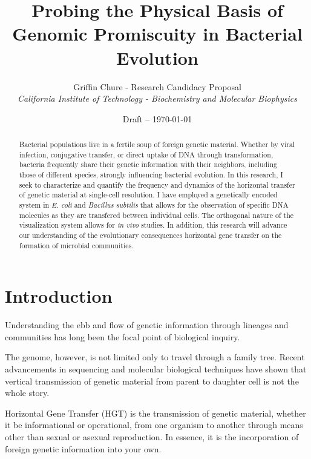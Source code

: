 
\usepackage{textcomp}

\title{Probing the Physical Basis of Genomic Promiscuity in Bacterial Evolution}
\author{Griffin Chure - Research Candidacy Proposal\\
	\textit{\small California Institute of Technology - Biochemistry and Molecular
	Biophysics}}
\date{\small Draft -- \today}


\maketitle
\begin{abstract}
	Bacterial populations live in a fertile soup of foreign genetic
	material. Whether by viral infection, conjugative transfer, or
	direct uptake of DNA through transformation, bacteria frequently share
	their genetic information with their neighbors, including those of
	different species, strongly influencing bacterial evolution. In this
	research, I seek to characterize and quantify the frequency and dynamics
	of the horizontal transfer of genetic material at single-cell
	resolution. I have employed a genetically encoded system in \textit{E.
	coli} and \textit{Bacillus subtilis} that allows for the observation of
	specific DNA molecules as they are transfered between individual cells.
	The orthogonal nature of the visualization system allows for \textit{in
	vivo} studies. In addition, this research will advance our understanding of the
	evolutionary consequences horizontal gene transfer on the formation of
	microbial communities. 
\end{abstract}

\section*{Introduction}
Understanding the ebb and flow of genetic information through lineages and
communities has long been the focal point of biological inquiry.  

The genome, however, is not limited only to travel through a family tree.
Recent advancements in sequencing and molecular biological techniques have shown
that vertical transmission of genetic material from parent to daughter cell is
not the whole story. 


Horizontal Gene Transfer (HGT) is the transmission of genetic material, whether
it be informational or operational, from one organism to another through means
other than sexual or asexual reproduction. In essence, it is the incorporation
of foreign genetic information into your own. 

